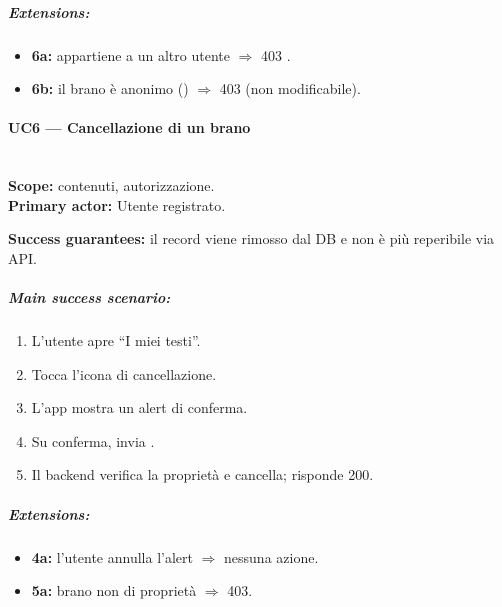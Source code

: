 \subparagraph{Extensions:}
\begin{itemize}
    \item \textbf{6a:}  appartiene a un altro utente
    $\Rightarrow$ 403 .
    \item \textbf{6b:} il brano è anonimo ()
    $\Rightarrow$ 403 (non modificabile).
\end{itemize}

\paragraph{UC6 --- Cancellazione di un brano}\hfill\\
\textbf{Scope:} contenuti, autorizzazione.\\
\textbf{Primary actor:} Utente registrato.

\textbf{Success guarantees:} il record  viene rimosso dal DB e
non è più reperibile via API.

\subparagraph{Main success scenario:}
\begin{enumerate}
    \item L'utente apre ``I miei testi''.
    \item Tocca l'icona di cancellazione.
    \item L'app mostra un alert di conferma.
    \item Su conferma, invia .
    \item Il backend verifica la proprietà e cancella; risponde 200.
\end{enumerate}

\subparagraph{Extensions:}
\begin{itemize}
    \item \textbf{4a:} l'utente annulla l'alert $\Rightarrow$ nessuna azione.
    \item \textbf{5a:} brano non di proprietà $\Rightarrow$ 403.
\end{itemize}
